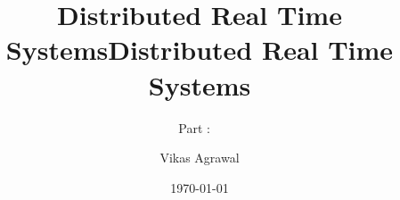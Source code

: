 

\ifoverview
\title[Distributed Real Time Systems - \partTitle \ (Version \partVersion)]{Distributed Real Time Systems}

\subtitle[\partTitle]{\partTitle}

\else

\title[Distributed Real Time Systems - Part \partNo :\ \partTitle \ (Version \partVersion)]{Distributed Real Time Systems}

\subtitle[Part  \partNo :\  \partTitle]{Part \partNo : \  \partTitle}

\fi

\author[Vikas Agrawal]{Vikas Agrawal}%


\ifpartII
{}
\fi


\date[\copyright{} 2015]{\today}



